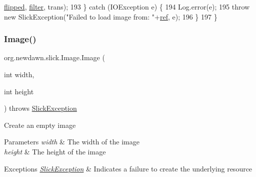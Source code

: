 \begin{DoxyCode}
      \mbox{\hyperlink{classorg_1_1newdawn_1_1slick_1_1_image_a45ebd330142d5ca956f6634158971ab0}{flipped}}, \mbox{\hyperlink{classorg_1_1newdawn_1_1slick_1_1_image_a1c6f09687817420f3762f32bb1c3ed76}{filter}}, trans);
193         \} \textcolor{keywordflow}{catch} (IOException e) \{
194             Log.error(e);
195             \textcolor{keywordflow}{throw} \textcolor{keyword}{new} SlickException(\textcolor{stringliteral}{"Failed to load image from: "}+\mbox{\hyperlink{classorg_1_1newdawn_1_1slick_1_1_image_a32694687591a80299d8b8ad1ea070cee}{ref}}, e);
196         \}
197     \}
\end{DoxyCode}
\mbox{\label{classorg_1_1newdawn_1_1slick_1_1_image_abcf4e3bfc122edb938f0d196bdc67d2a}} 
\subsubsection{\texorpdfstring{Image()}{Image()}\hspace{0.1cm}{\footnotesize\ttfamily [9/16]}}
{\footnotesize\ttfamily org.\+newdawn.\+slick.\+Image.\+Image (\begin{DoxyParamCaption}\item[{int}]{width,  }\item[{int}]{height }\end{DoxyParamCaption}) throws \mbox{\hyperlink{classorg_1_1newdawn_1_1slick_1_1_slick_exception}{Slick\+Exception}}\hspace{0.3cm}{\ttfamily [inline]}}

Create an empty image


\begin{DoxyParams}{Parameters}
{\em width} & The width of the image \\
\hline
{\em height} & The height of the image \\
\hline
\end{DoxyParams}

\begin{DoxyExceptions}{Exceptions}
{\em \mbox{\hyperlink{classorg_1_1newdawn_1_1slick_1_1_slick_exception}{Slick\+Exception}}} & Indicates a failure to create the underlying resource \\
\hline
\end{DoxyExceptions}

